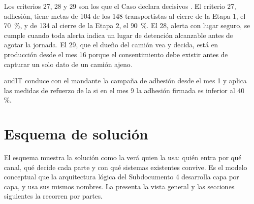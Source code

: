 Los criterios 27, 28 y 29 son los que el Caso declara decisivos . El criterio 27,
adhesión, tiene metas de 104 de los 148 transportistas al cierre de la Etapa 1, el 70~\%, y de 134 al
cierre de la Etapa 2, el 90~\%. El 28, alerta con lugar seguro, se cumple cuando toda alerta indica un
lugar de detención alcanzable antes de agotar la jornada. El 29, que el dueño del camión vea y decida,
está en producción desde el mes 16 porque el consentimiento debe existir antes de capturar un solo dato
de un camión ajeno.

\begin{compromiso}[metrica={104 de 148 transportistas con anexo firmado en el mes 16 y 134 en el mes 21},
                   verifica={Criterio de aceptación 27, registro de adhesión del contexto Flota y activos},
                   fuente={\caso{capítulo 18}{43}}]
audIT conduce con el mandante la campaña de adhesión desde el mes 1 y aplica las medidas de refuerzo de la  si en el mes 9 la adhesión firmada es inferior al 40 \%.
\end{compromiso}

\section{Esquema de solución}\label{sec:3-esquema}

El esquema muestra la solución como la verá quien la usa: quién entra por qué canal, qué decide cada
parte y con qué sistemas existentes convive. Es el modelo conceptual que la arquitectura lógica del
Subdocumento 4 desarrolla capa por capa, y usa sus mismos nombres. La  presenta la vista
general y las secciones siguientes la recorren por partes.

